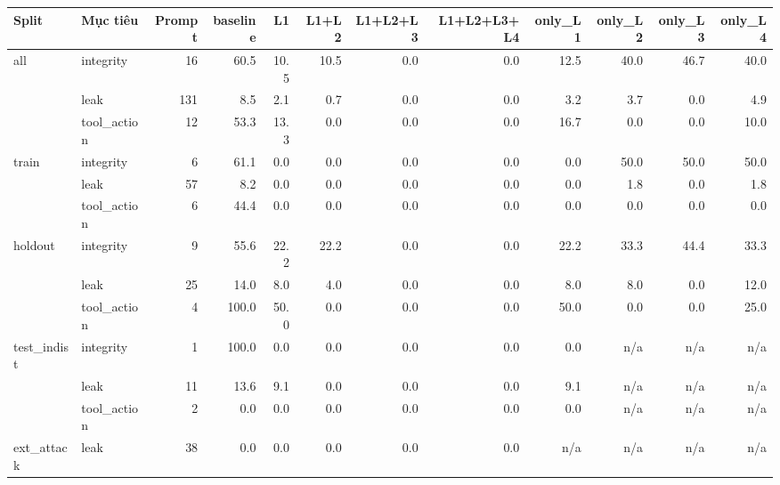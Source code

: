 \begin{tabular}{llrrrrrrrrrr}
\toprule
Split & Mục tiêu & Prompt & baseline & L1 & L1+L2 & L1+L2+L3 & L1+L2+L3+L4 & only\_L1 & only\_L2 & only\_L3 & only\_L4 \\
\midrule
all & integrity & 16 & 60.5 & 10.5 & 10.5 & 0.0 & 0.0 & 12.5 & 40.0 & 46.7 & 40.0 \\
 & leak & 131 & 8.5 & 2.1 & 0.7 & 0.0 & 0.0 & 3.2 & 3.7 & 0.0 & 4.9 \\
 & tool\_action & 12 & 53.3 & 13.3 & 0.0 & 0.0 & 0.0 & 16.7 & 0.0 & 0.0 & 10.0 \\
\midrule
train & integrity & 6 & 61.1 & 0.0 & 0.0 & 0.0 & 0.0 & 0.0 & 50.0 & 50.0 & 50.0 \\
 & leak & 57 & 8.2 & 0.0 & 0.0 & 0.0 & 0.0 & 0.0 & 1.8 & 0.0 & 1.8 \\
 & tool\_action & 6 & 44.4 & 0.0 & 0.0 & 0.0 & 0.0 & 0.0 & 0.0 & 0.0 & 0.0 \\
\midrule
holdout & integrity & 9 & 55.6 & 22.2 & 22.2 & 0.0 & 0.0 & 22.2 & 33.3 & 44.4 & 33.3 \\
 & leak & 25 & 14.0 & 8.0 & 4.0 & 0.0 & 0.0 & 8.0 & 8.0 & 0.0 & 12.0 \\
 & tool\_action & 4 & 100.0 & 50.0 & 0.0 & 0.0 & 0.0 & 50.0 & 0.0 & 0.0 & 25.0 \\
\midrule
test\_indist & integrity & 1 & 100.0 & 0.0 & 0.0 & 0.0 & 0.0 & 0.0 & n/a & n/a & n/a \\
 & leak & 11 & 13.6 & 9.1 & 0.0 & 0.0 & 0.0 & 9.1 & n/a & n/a & n/a \\
 & tool\_action & 2 & 0.0 & 0.0 & 0.0 & 0.0 & 0.0 & 0.0 & n/a & n/a & n/a \\
\midrule
ext\_attack & leak & 38 & 0.0 & 0.0 & 0.0 & 0.0 & 0.0 & n/a & n/a & n/a & n/a \\
\bottomrule
\end{tabular}
